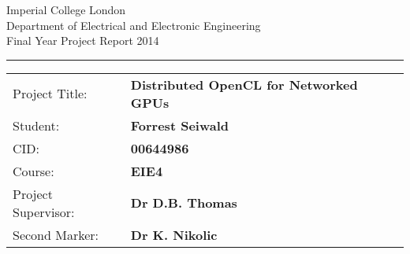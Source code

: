 \documentclass[../thesis.tex]{subfiles}
\begin{document}
\begin{titlepage}
\setlength{\parindent}{0pt}
\setlength{\parskip}{0pt}

{
\Large
\raggedright
Imperial College London\\[17pt]
Department of Electrical and Electronic Engineering\\[17pt]
Final Year Project Report 2014\\[17pt]

}
\rule{\columnwidth}{3pt}

\vfill

\centering

\vfill

\setlength{\tabcolsep}{0pt}
\begin{tabular}{p{40mm}p{\dimexpr\columnwidth-40mm}}
Project Title: & \textbf{Distributed OpenCL for Networked GPUs} \\[12pt]
Student: & \textbf{Forrest Seiwald} \\[12pt]
CID: & \textbf{00644986} \\[12pt]
Course: & \textbf{EIE4} \\[12pt]
Project Supervisor: & \textbf{Dr D.B. Thomas} \\[12pt]
Second Marker: & \textbf{Dr K. Nikolic} \\
\end{tabular}
\end{titlepage}
\end{document}
